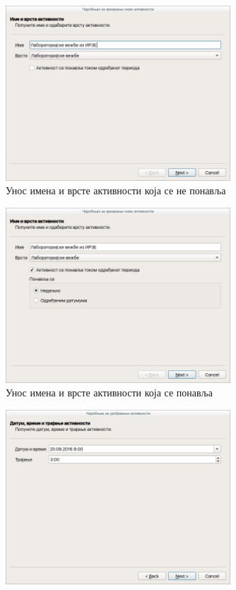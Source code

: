 \documentclass[a4paper, 12pt, diplomski]{etfcyr}
\begin{document}
\begin{justify}
					\begin{figure}[H]
						\begin{center}
							\includegraphics[width=0.75\textwidth]{manual/activity_wizard_name_and_type.png}
						\end{center}
						\caption{Унос имена и врсте активности која се не понавља}
						\label{figure:single_name_and_type}
					\end{figure}
					\begin{figure}[H]
						\begin{center}
							\includegraphics[width=0.75\textwidth]{manual/activity_wizard_name_and_type_repetitive.png}
						\end{center}
						\caption{Унос имена и врсте активности која се понавља}
						\label{figure:repetitive_name_and_type}
					\end{figure}
					\begin{figure}[H]
						\begin{center}
							\includegraphics[width=0.75\textwidth]{manual/activity_wizard_time.png}

\end{center}
\end{figure}
\end{justify}
\end{document}
